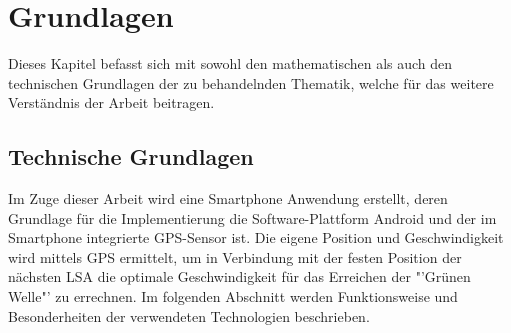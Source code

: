 \chapter{\label{chap:grundlagen}Grundlagen}
Dieses Kapitel befasst sich mit sowohl den mathematischen als auch den technischen Grundlagen der zu behandelnden Thematik, welche für das weitere Verständnis der Arbeit beitragen.
\section{\label{sec:technGrundlagen}Technische Grundlagen}
Im Zuge dieser Arbeit wird eine Smartphone Anwendung erstellt, deren Grundlage für die Implementierung die Software-Plattform Android und der im \gls{Smartphone} integrierte \gls{GPS}-Sensor ist. Die eigene Position und Geschwindigkeit wird mittels \gls{GPS} ermittelt, um in Verbindung mit der festen Position der nächsten \gls{LSA} die optimale Geschwindigkeit für das Erreichen der "'Grünen Welle"' zu errechnen. Im folgenden Abschnitt werden Funktionsweise und Besonderheiten der verwendeten Technologien beschrieben. 
